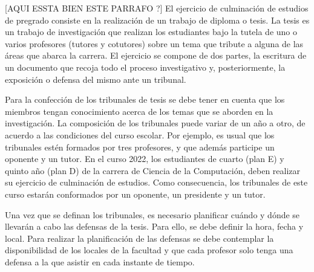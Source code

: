 [AQUI ESSTA BIEN ESTE PARRAFO ?]
El ejercicio de culminación de estudios de pregrado consiste en la 
realización de un trabajo de diploma o tesis.
La tesis es un trabajo de investigación que realizan
los estudiantes bajo la tutela de uno o varios profesores (tutores y cotutores)
sobre un tema que tribute a alguna de las áreas que abarca la carrera.
El ejercicio se compone de dos partes, la escritura de un documento que recoja
todo el proceso investigativo y, posteriormente, la exposición o defensa del mismo ante 
un tribunal.


Para la confección de los tribunales de tesis se debe tener en cuenta que los miembros 
tengan conocimiento acerca de los temas que se aborden en la investigación.
La composición de los tribunales puede variar de un año a otro, de acuerdo a las 
condiciones del curso escolar. Por ejemplo, es usual que los tribunales estén formados 
por tres profesores, y que además participe un oponente y un tutor.
En el curso 2022, los estudiantes de cuarto (plan E) y quinto año (plan D) de la carrera de Ciencia de la Computación,
deben realizar su ejercicio de culminación de estudios. Como consecuencia, los tribunales de este curso 
estarán conformados por un oponente, un presidente y un tutor.
 


Una vez que se definan los tribunales, es necesario planificar cuándo 
y dónde se llevarán a cabo las defensas de la tesis. Para ello, se debe definir
la hora, fecha y local.
Para realizar la planificación de las defensas se debe contemplar
la disponibilidad de los locales de la facultad y que cada profesor solo tenga 
una defensa a la que asistir en cada instante de tiempo.


